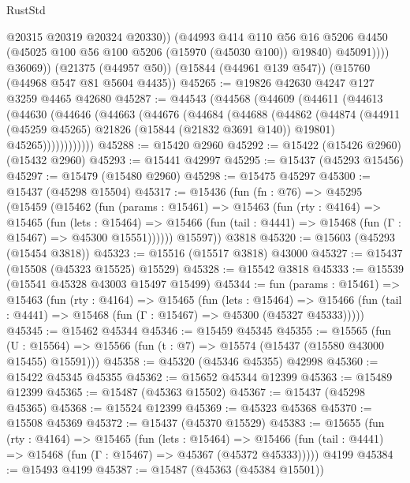 \begin{lexlean}{RustStd}
\begin{coremodule}
                  @20315
                  @20319
                  @20324
                  @20330))
              (@44993
                @414
                @110
                @56
                @16
                @5206
                @4450
                (@45025 @100 @56 @100 @5206 (@15970 (@45030 @100)) @19840)
                @45091))))
        @36069))
    (@21375 (@44957 @50))
    (@15844 (@44961 @139 @547))
    (@15760 (@44968 @547 @81 @5604 @4435))
@45265 := @19826 @42630 @4247 @127 @3259 @4465 @42680
@45287 := @44543
    (@44568
      (@44609
        (@44611
          (@44613
            (@44630
              (@44646
                (@44663
                  (@44676
                    (@44684
                      (@44688
                        (@44862
                          (@44874
                            (@44911 (@45259 @45265) @21826 (@15844 (@21832 @3691 @140)) @19801)
                            @45265))))))))))))
@45288 := @15420 @2960
@45292 := @15422 (@15426 @2960) (@15432 @2960)
@45293 := @15441 @42997
@45295 := @15437 (@45293 @15456)
@45297 := @15479 (@15480 @2960)
@45298 := @15475 @45297
@45300 := @15437 (@45298 @15504)
@45317 := @15436
    (fun (fn : @76) =>
    @45295
      (@15459
        (@15462
          (fun (params : @15461) =>
          @15463
            (fun (rty : @4164) =>
            @15465
              (fun (lets : @15464) =>
              @15466 (fun (tail : @4441) => @15468 (fun (Γ : @15467) => @45300 @15551))))))
        @15597))
    @3818
@45320 := @15603 (@45293 (@15454 @3818))
@45323 := @15516 (@15517 @3818) @43000
@45327 := @15437 (@15508 (@45323 @15525) @15529)
@45328 := @15542 @3818
@45333 := @15539 (@15541 @45328 @43003 @15497 @15499)
@45344 := fun (params : @15461) =>
  @15463
    (fun (rty : @4164) =>
    @15465
      (fun (lets : @15464) =>
      @15466 (fun (tail : @4441) => @15468 (fun (Γ : @15467) => @45300 (@45327 @45333)))))
@45345 := @15462 @45344
@45346 := @15459 @45345
@45355 := @15565
    (fun (U : @15564) => @15566 (fun (t : @7) => @15574 (@15437 (@15580 @43000 @15455) @15591)))
@45358 := @45320 (@45346 @45355) @42998
@45360 := @15422 @45345 @45355
@45362 := @15652 @45344 @12399
@45363 := @15489 @12399
@45365 := @15487 (@45363 @15502)
@45367 := @15437 (@45298 @45365)
@45368 := @15524 @12399
@45369 := @45323 @45368
@45370 := @15508 @45369
@45372 := @15437 (@45370 @15529)
@45383 := @15655
    (fun (rty : @4164) =>
    @15465
      (fun (lets : @15464) =>
      @15466 (fun (tail : @4441) => @15468 (fun (Γ : @15467) => @45367 (@45372 @45333)))))
    @4199
@45384 := @15493 @4199
@45387 := @15487 (@45363 (@45384 @15501))

\end{coremodule}
\end{lexlean}
